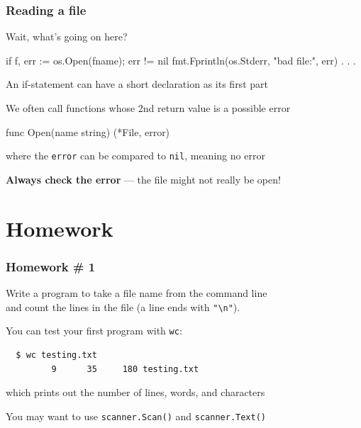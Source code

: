 \documentclass[handout,compress,t,11pt]{beamer}
\begin{document}
\begin{frame}[fragile]
    \frametitle{Reading a file}
    Wait, what's going on here?
\begin{golang}
if f, err := os.Open(fname); err != nil {
    fmt.Fprintln(os.Stderr, "bad file:", err)
} . . .
\end{golang}
    \vspace{0.5\baselineskip}
An if-statement can have a short declaration as its first part \par
    \vspace{\baselineskip}
We often call functions whose 2nd return value is a possible error \par
\begin{golang}
    func Open(name string) (*File, error)
\end{golang}
where the \verb|error| can be compared to \verb|nil|, meaning no error \par
    \vspace{\baselineskip}
\alert{\bf Always check the error} --- the file might not really be open! \par
\end{frame}


\section{Homework}
\begin{frame}[fragile]
    \frametitle{Homework \# 1}
    Write a program to take a file name from the command line \\
    and count the lines in the file (a line ends with \verb|"\n"|). \par
    \vspace{2\baselineskip}
    You can test your first program with \verb|wc|: \par
    \vspace{-0.2\baselineskip}
    {\scriptsize
\begin{verbatim}
  $ wc testing.txt
         9      35     180 testing.txt
\end{verbatim}} \par
    which prints out the number of lines, words, and characters \par
    \vspace{2\baselineskip}
    You may want to use \verb|scanner.Scan()| and \verb|scanner.Text()|
\end{frame}
\end{document}
